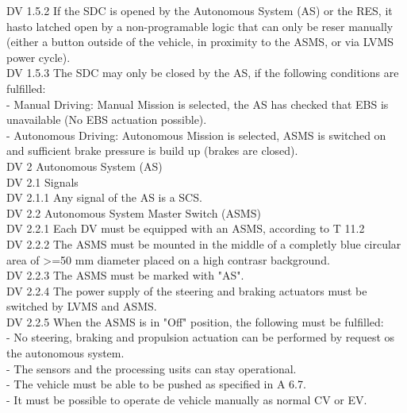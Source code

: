 \documentclass{article}
\begin{document}
DV 1.5.2 If the SDC is opened by the Autonomous System (AS) or the RES, it hasto latched open by a non-programable logic that can only be reser manually (either a button outside of the vehicle, in proximity to the ASMS, or via LVMS power cycle).\\

DV 1.5.3 The SDC may only be closed by the AS, if the following conditions are fulfilled:\\
	- Manual Driving: Manual Mission is selected, the AS has checked that EBS is unavailable (No EBS actuation possible).\\
	- Autonomous Driving: Autonomous Mission is selected, ASMS is switched on and sufficient brake pressure is build up (brakes are closed).\\
	
DV 2 Autonomous System (AS)\\

DV 2.1 Signals\\

DV 2.1.1 Any signal of the AS is a SCS.\\

DV 2.2 Autonomous System Master Switch (ASMS)\\

DV 2.2.1 Each DV must be equipped with an ASMS, according to T 11.2\\

DV 2.2.2 The ASMS must be mounted in the middle of a completly blue circular area of >=50 mm diameter placed on a high contrasr background.\\

DV 2.2.3 The ASMS must be marked with "AS".\\

DV 2.2.4 The power supply of the steering and braking actuators must be switched by LVMS and ASMS.\\

DV 2.2.5 When the ASMS is in "Off" position, the following must be fulfilled:\\
	- No steering, braking and propulsion actuation can be performed by request os the autonomous system.\\
	- The sensors and the processing usits can stay operational.\\
	- The vehicle must be able to be pushed as specified in A 6.7.\\
	- It must be possible to operate de vehicle manually as normal CV or EV.\\
\end{document}
